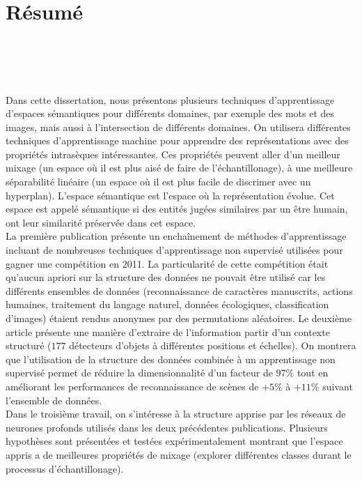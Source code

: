 \chapter*{R\'{e}sum\'{e}\\~~~~~~~~\\~~~~~~~~~~~}

\vspace{-2.8cm}

Dans cette dissertation, nous présentons plusieurs techniques d'apprentissage
d'espaces sémantiques pour différents domaines, par exemple des mots et des
images, mais aussi à l'intersection de différents domaines.  On utilisera
différentes techniques d'apprentissage machine pour apprendre des
représentations avec des propriétés intrasèques intéressantes. Ces propriétés
peuvent aller d'un meilleur mixage (un espace où il est plus aisé de faire de
l'échantillonage), à une meilleure séparabilité linéaire (un espace où il est
plus facile de discrimer avec un hyperplan). L'espace sémantique est l'espace où
la représentation évolue. Cet espace est appelé sémantique si des entités
jugées similaires par un être humain, ont leur similarité préservée dans cet
espace.
\\

\vspace{-0.2cm}
La première publication présente un enchaînement de méthodes d'apprentissage
incluant de nombreuses techniques d'apprentissage non supervisé utilisées pour
gagner une compétition en 2011. La particularité de cette compétition était
qu'aucun apriori sur la structure des données ne pouvait être utilisé car les
différents ensembles de données (reconnaissance de caractères manuscrits,
actions humaines, traitement du langage naturel, données écologiques,
classification d'images) étaient rendus anonymes par des permutations
aléatoires. Le deuxième article présente une manière d'extraire de l'information
partir d'un contexte structuré ($177$ détecteurs d'objets à différentes
positions et échelles). On montrera que l'utilisation de la structure des
données combinée à un apprentissage non supervisé permet de réduire la
dimensionnalité d'un facteur de $97\%$ tout en améliorant les performances de
reconnaissance de scènes de $+5\%$ à $+11\%$ suivant l'ensemble de données.
\\

\vspace{-0.2cm}
Dans le troisième travail, on s'intéresse à la structure apprise par les
réseaux de neurones profonds utilisés dans les deux précédentes publications.
Plusieurs hypothèses sont présentées et testées expérimentalement montrant que
l'espace appris a de meilleures propriétés de mixage (explorer
différentes classes durant le processus d'échantillonage).
\\

